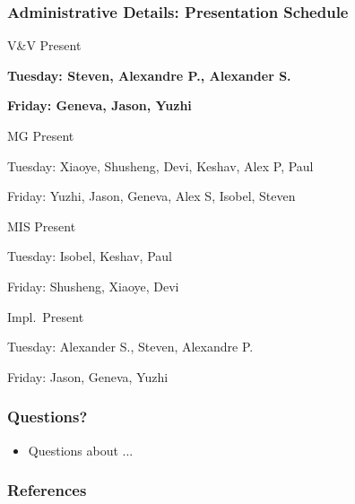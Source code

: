 \documentclass[t,12pt,numbers,fleqn]{beamer}
\begin{document}
\begin{frame}
\frametitle{Administrative Details: Presentation Schedule}

\bi
\item V\&V Present
\bi
\item \textbf{Tuesday: Steven, Alexandre P., Alexander S.}
\item \textbf{Friday: Geneva, Jason, Yuzhi}
\ei
\item MG Present
\bi
\item Tuesday: Xiaoye, Shusheng, Devi, Keshav, Alex P, Paul
\item Friday: Yuzhi, Jason, Geneva, Alex S, Isobel, Steven
\ei
\item MIS Present
\bi
\item Tuesday: Isobel, Keshav, Paul
\item Friday: Shusheng, Xiaoye, Devi
\ei
\item Impl.\ Present
\bi
\item Tuesday: Alexander S., Steven, Alexandre P.
\item Friday: Jason, Geneva, Yuzhi
\ei

\ei

\end{frame}


\begin{frame}
\frametitle{Questions?}
\begin{itemize}
\item Questions about ...
\end{itemize}
\end{frame}


\begin{frame}[allowframebreaks]
\frametitle{References}



\end{frame}

\end{document}
